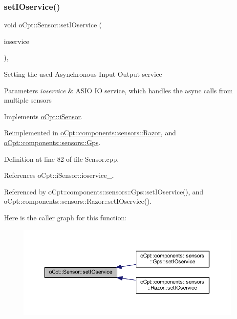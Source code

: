 \subsubsection{\texorpdfstring{set\+I\+Oservice()}{setIOservice()}}
{\footnotesize\ttfamily void o\+Cpt\+::\+Sensor\+::set\+I\+Oservice (\begin{DoxyParamCaption}\item[{boost\+::shared\+\_\+ptr$<$ boost\+::asio\+::io\+\_\+service $>$}]{ioservice }\end{DoxyParamCaption})\hspace{0.3cm}{\ttfamily [override]}, {\ttfamily [virtual]}}

Setting the used Asynchronous Input Output service 
\begin{DoxyParams}{Parameters}
{\em ioservice} & A\+S\+IO IO service, which handles the async calls from multiple sensors \\
\hline
\end{DoxyParams}


Implements \hyperlink{classo_cpt_1_1i_sensor_a83b62cc63498ca4c335f85639e39656d}{o\+Cpt\+::i\+Sensor}.



Reimplemented in \hyperlink{classo_cpt_1_1components_1_1sensors_1_1_razor_a0f251fe3b51bf1a96b5d1e14e69a6d57}{o\+Cpt\+::components\+::sensors\+::\+Razor}, and \hyperlink{classo_cpt_1_1components_1_1sensors_1_1_gps_ad613b81625402daa6fdae80022fde18c}{o\+Cpt\+::components\+::sensors\+::\+Gps}.



Definition at line 82 of file Sensor.\+cpp.



References o\+Cpt\+::i\+Sensor\+::ioservice\+\_\+.



Referenced by o\+Cpt\+::components\+::sensors\+::\+Gps\+::set\+I\+Oservice(), and o\+Cpt\+::components\+::sensors\+::\+Razor\+::set\+I\+Oservice().

Here is the caller graph for this function\+:\nopagebreak
\begin{figure}[H]
\begin{center}
\leavevmode
\includegraphics[width=350pt]{classo_cpt_1_1_sensor_ae7d47e18df5eb7854bf71fbbee9568df_icgraph}
\end{center}
\end{figure}
\hypertarget{classo_cpt_1_1_sensor_a44ad78c2c091ca9cf72295293f8c5b74}{}\label{classo_cpt_1_1_sensor_a44ad78c2c091ca9cf72295293f8c5b74} 
